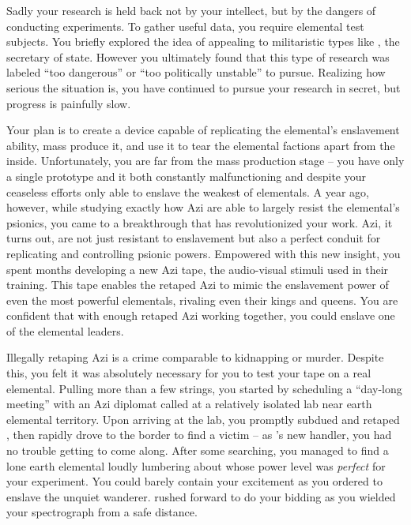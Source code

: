 \documentclass[char]{elementals}
\begin{document}
Sadly your research is held back not by your intellect, but by the dangers of conducting experiments. To gather useful data, you require elemental test subjects. You briefly explored the idea of appealing to militaristic types like \cDema{\intro}, the secretary of state. However you ultimately found that this type of research was labeled ``too dangerous'' or ``too politically unstable'' to pursue. Realizing how serious the situation is, you have continued to pursue your research in secret, but progress is painfully slow.

Your plan is to create a device capable of replicating the elemental's enslavement ability, mass produce it, and use it to tear the elemental factions apart from the inside. Unfortunately, you are far from the mass production stage -- you have only a single prototype and it both constantly malfunctioning and despite your ceaseless efforts only able to enslave the weakest of elementals. A year ago, however, while studying exactly how Azi are able to largely resist the elemental's psionics, you came to a breakthrough that has revolutionized your work. Azi, it turns out, are not just resistant to enslavement but also a perfect conduit for replicating and controlling psionic powers. Empowered with this new insight, you spent months developing a new Azi tape, the audio-visual stimuli used in their training. This tape enables the retaped Azi to mimic the enslavement power of even the most powerful elementals, rivaling even their kings and queens. You are confident that with enough retaped Azi working together, you could enslave one of the elemental leaders.

Illegally retaping Azi is a crime comparable to kidnapping or murder. Despite this, you felt it was absolutely necessary for you to test your tape on a real elemental. Pulling more than a few strings, you started by scheduling a ``day-long meeting'' with an Azi diplomat called \cDiplomat{\intro} at a relatively isolated lab near earth elemental territory. Upon arriving at the lab, you promptly subdued and retaped \cDiplomat{}, then rapidly drove to the border to find a victim -- as \cDiplomat{}'s new handler, you had no trouble getting \cDiplomat{\them} to come along. After some searching, you managed to find a lone earth elemental loudly lumbering about whose power level was \emph{perfect} for your experiment. You could barely contain your excitement as you ordered \cDiplomat{} to enslave the unquiet wanderer. \cDiplomat{} rushed forward to do your bidding as you wielded your spectrograph from a safe distance.
\end{document}
